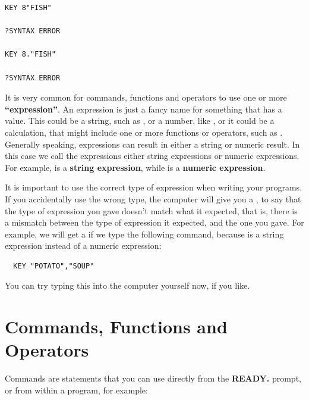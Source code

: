 \newpage
\begin{tcolorbox}[colback=black,coltext=white]
\verbatimfont{\codefont}
\begin{verbatim}
KEY 8"FISH"

?SYNTAX ERROR

KEY 8."FISH"

?SYNTAX ERROR
\end{verbatim}
\end{tcolorbox}


It is very common for commands, functions and operators to use one or
more {\bf``expression''}.
An expression is just a fancy name for something that has a value.
This could be a string, such as , or a number, like
, or it could be a calculation, that might include
one or more functions or operators, such as .
Generally speaking, expressions can result in either a string or numeric result.
In this case we call the expressions either string expressions or numeric expressions.
For example,  is a {\bf string expression}, while
 is a {\bf numeric expression}.

It is important to use the correct type of expression when writing your programs.
If you accidentally use the wrong type, the computer will give you a
, to say that the type
of expression you gave doesn't match what it expected, that is, there
 is a mismatch between the type of expression
it expected, and the one you gave.  For example, we will get a
 if we type the following command,
because  is a string expression instead of a numeric expression:

\begin{tcolorbox}[colback=black,coltext=white]
\verbatimfont{\codefont}
\begin{verbatim}
  KEY "POTATO","SOUP"
\end{verbatim}
\end{tcolorbox}

You can try typing this into the computer yourself now, if you like.

\newpage
\section{Commands, Functions and Operators}

Commands are statements that you can use directly from the {\bf READY.}
prompt, or from within a program, for example:

